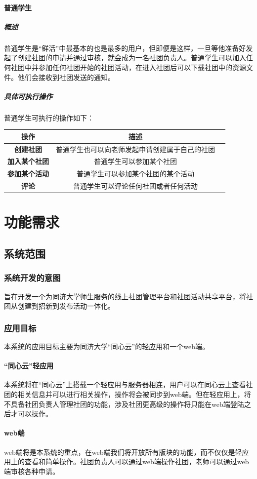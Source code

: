 \documentclass[UTF8]{ctexart}
\begin{document}
\paragraph{普通学生}
\subparagraph{概述}
普通学生是“鲜活”中最基本的也是最多的用户，但即便是这样，一旦等他准备好发起了创建社团的申请并通过审核，就会成为一名社团负责人。普通学生可以加入任何社团中并参加任何社团开始的社团活动，在进入社团后可以下载社团中的资源文件。他们会接收到社团发送的通知。
\subparagraph{具体可执行操作}
普通学生可执行的操作如下：
\newline
\newline
\begin{tabular}{ccc}
\toprule
操作& 描述\\
\midrule
\textbf{创建社团}& 普通学生也可以向老师发起申请创建属于自己的社团\\
\textbf{加入某个社团}& 普通学生可以参加某个社团\\
\textbf{参加某个活动}& 普通学生可以参加某个社团的某个活动\\
\textbf{评论}& 普通学生可以评论任何社团或者任何活动\\
\bottomrule
\end{tabular}

\section{功能需求}
\subsection{系统范围}
\subsubsection{系统开发的意图}
旨在开发一个为同济大学师生服务的线上社团管理平台和社团活动共享平台，将社团从创建到招新到发布活动一体化。
\subsubsection{应用目标}
本系统的应用目标主要为同济大学“同心云”的轻应用和一个web端。
\paragraph{“同心云”轻应用}
本系统将在“同心云”上搭载一个轻应用与服务器相连，用户可以在同心云上查看社团的相关信息并可以进行相关操作，操作将会被同步到web端。但在轻应用上，将不具备社团负责人管理社团的功能，涉及社团更高级的操作将只能在web端登陆之后才可以操作。
\paragraph{web端}
web端将是本系统的重点，在web端我们将开放所有版块的功能，而不仅仅是轻应用上的查看和简单操作。社团负责人可以通过web端操作社团，老师可以通过web端审核各种申请。
\end{document}
